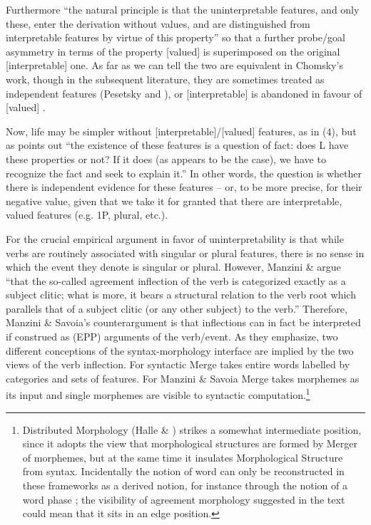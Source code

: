 \documentclass[output=paper]{langsci/langscibook}
\begin{document}
\begin{styleSfondomedioiColorexxi}
Furthermore “the natural principle is that the uninterpretable features, and only these, enter the derivation without values, and are distinguished from interpretable features by virtue of this property” so that a further probe/goal asymmetry in terms of the property [valued] is superimposed on the original [interpretable] one. As far as we can tell the two are equivalent in Chomsky’s work, though in the subsequent literature, they are sometimes treated as independent features (Pesetsky and \citealt{Torrego2007}), or [interpretable] is abandoned in favour of [valued] \citep{Preminger2014}. 
\end{styleSfondomedioiColorexxi}

\begin{styleSfondomedioiColorexxi}
 Now, life may be simpler without [interpretable]/[valued] features, as in (4), but as \citet[4]{Chomsky2001} points out “the existence of these features is a question of fact: does L have these properties or not? If it does (as appears to be the case), we have to recognize the fact and seek to explain it.” In other words, the question is whether there is independent evidence for these features – or, to be more precise, for their negative value, given that we take it for granted that there are interpretable, valued features (e.g. 1P, plural, etc.).
\end{styleSfondomedioiColorexxi}

\begin{styleSfondomedioiColorexxi}
For \citet{Chomsky1995} the crucial empirical argument in favor of uninterpretability is that while verbs are routinely associated with singular or plural features, there is no sense in which the event they denote is singular or plural. However, Manzini \& \citet[21]{Savoia2007} argue “that the so-called agreement inflection of the verb is categorized exactly as a subject clitic; what is more, it bears a structural relation to the verb root which parallels that of a subject clitic (or any other subject) to the verb.” Therefore, Manzini \& Savoia’s counterargument is that inflections can in fact be interpreted if construed as (EPP) arguments of the verb/event. As they emphasize, two different conceptions of the syntax-morphology interface are implied by the two views of the verb inflection. For \citet{Chomsky1995} syntactic Merge takes entire words labelled by categories and sets of features. For Manzini \& Savoia Merge takes morphemes as its input and single morphemes are visible to syntactic computation.\footnote{Distributed Morphology (Halle \& \citealt{Marantz1993}) strikes a somewhat intermediate position, since it adopts the view that morphological structures are formed by Merger of morphemes, but at the same time it insulates Morphological Structure from syntax. Incidentally the notion of word can only be reconstructed in these frameworks as a derived notion, for instance through the notion of a word phase \citep{Marantz2007}; the visibility of agreement morphology suggested in the text could mean that it sits in an edge position.} 
\end{styleSfondomedioiColorexxi}
\end{document}
